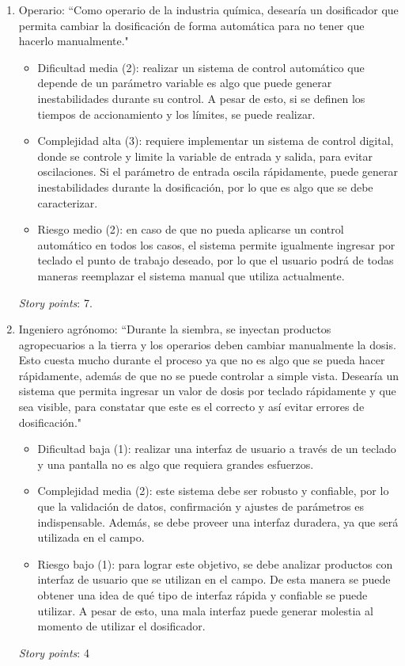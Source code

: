 \documentclass[
11pt, %
]{charter}
\begin{document}
\begin{enumerate}
\item Operario: ``Como operario de la industria química, desearía un dosificador que permita cambiar la dosificación de forma automática para no tener que hacerlo manualmente."

\begin{itemize}
	\item Dificultad media (2): realizar un sistema de control automático que depende de un parámetro variable es algo que puede generar inestabilidades durante su control. A pesar de esto, si se definen los tiempos de accionamiento y los límites, se puede realizar.
	\item Complejidad alta (3): requiere implementar un sistema de control digital, donde se controle y limite la variable de entrada y salida, para evitar oscilaciones. Si el parámetro de entrada oscila rápidamente, puede generar inestabilidades durante la dosificación, por lo que es algo que se debe caracterizar.
	\item Riesgo medio (2): en caso de que no pueda aplicarse un control automático en todos los casos, el sistema permite igualmente ingresar por teclado el punto de trabajo deseado, por lo que el usuario podrá de todas maneras reemplazar el sistema manual que utiliza actualmente.
\end{itemize}

\textit{Story points}: 7.

\item Ingeniero agrónomo: ``Durante la siembra, se inyectan productos agropecuarios a la tierra y los operarios deben cambiar manualmente la dosis. Esto cuesta mucho durante el proceso ya que no es algo que se pueda hacer rápidamente, además de que no se puede controlar a simple vista. Desearía un sistema que permita ingresar un valor de dosis por teclado rápidamente y que sea visible, para constatar que este es el correcto y así evitar errores de dosificación."

\begin{itemize}
	\item Dificultad baja (1): realizar una interfaz de usuario a través de un teclado y una pantalla no es algo que requiera grandes esfuerzos.
	\item Complejidad media (2): este sistema debe ser robusto y confiable, por lo que la validación de datos, confirmación y ajustes de parámetros es indispensable. Además, se debe proveer una interfaz duradera, ya que será utilizada en el campo.
	\item Riesgo bajo (1): para lograr este objetivo, se debe analizar productos con interfaz de usuario que se utilizan en el campo. De esta manera se puede obtener una idea de qué tipo de interfaz rápida y confiable se puede utilizar. A pesar de esto, una mala interfaz puede generar molestia al momento de utilizar el dosificador.
\end{itemize}

\textit{Story points}: 4


\end{enumerate}
\end{document}
